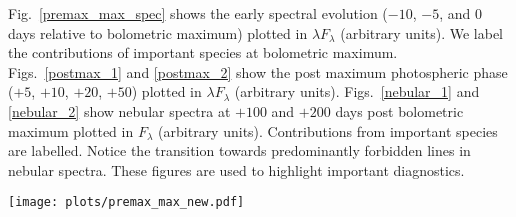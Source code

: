 \documentclass[useAMS,usenatbib,useasmath]{mnras}
\newcommand{\caii}{\mbox{Ca~{\sc ii}}}
\newcommand{\oi}{\mbox{O~{\sc i}}}
\newcommand{\lb}{$\lambda$}
\def\fig{Fig.}
\def\figs{Figs.}
\begin{document}
\fig~\ref{premax_max_spec} shows the early spectral evolution ($-10$, $-5$, and 0 days relative to bolometric maximum) plotted in $\lambda F_{\lambda}$ (arbitrary units). We label the contributions of important species at bolometric maximum. \figs~\ref{postmax_1} and \ref{postmax_2} show the post maximum photospheric phase ($+5$, $+10$, $+20$, $+50$) plotted in $\lambda F_{\lambda}$ (arbitrary units). \figs~\ref{nebular_1} and \ref{nebular_2} show nebular spectra at $+100$ and $+200$ days post bolometric maximum plotted in $F_{\lambda}$ (arbitrary units). Contributions from important species are labelled. Notice the transition towards predominantly forbidden lines in nebular spectra. These figures are used to highlight important diagnostics.

\begin{figure*} 
\begin{minipage}[t]{\linewidth}
\centering
\texttt{[image: plots/premax\_max\_new.pdf]}
\end{minipage}
\caption{Spectral comparisons between models in the pre-maximum ($-10$ and $-5$ days relative to bolometric maximum) and bolometric maximum plotted in $\lambda F_\lambda$ vs \lb\ in order to contrast the NIR tail of the spectrum. All models have been scaled by the same factor, and we have added an offset to allow spectra to be more easily distinguished. During these phases the optical spectra (3500 to 7000 \AA) are very similar. However, there are differences in the amount of UV blanketing occurring shortward of 3500 \AA, and in the strength of \oi\ and the \caii\ NIR triplet. We also see that the strength of the \oi\ feature decreases with age while the \caii\ NIR triplet increases in strength.}
\label{premax_max_spec}
\end{figure*}
\end{document}

